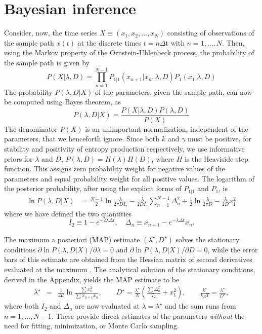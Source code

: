 \documentclass[fleqn,10pt]{wlscirep}
\begin{document}
\section*{Bayesian inference}
Consider, now, the time
series $X\equiv(x_{1},x_{2},\ldots,x_{N})$ consisting of observations
of the sample path $x(t)$ at the discrete times $t=n\Delta$t with
$n=1,\ldots,N.$ Then, using the Markov property of the Ornstein-Uhlenbeck
process, the probability of the sample path is given by \cite{wang1945theory}
\begin{equation}
P(X|\lambda,D)=\prod_{n=1}^{N-1}P_{1|1}(x_{n+1}|x_{n},\lambda,D)P_{1}(x_{1}|\lambda,D)
\end{equation}
The probability $P(\lambda,D|X)$ of the parameters, given the sample
path, can now be computed using Bayes theorem, as
\[
P(\lambda,D|X)=\frac{P(X|\lambda,D)P(\lambda,D)}{P(X)}
\]
The denominator $P(X)$ is an unimportant normalization, independent
of the parameters, that we henceforth ignore. Since both $k$ and
$\gamma$ must be positive, for stability and positivity of entropy
production respectively, we use informative priors for $\lambda$
and $D$, $P(\lambda,D)=H(\lambda)H(D)$, where $H$ is the Heaviside
step function. This assigns zero probability weight for negative values
of the parameters and equal probability weight for all positive values.
The logarithm of the posterior probability, after using the explicit
forms of $P_{1|1}$ and $P_{1}$, is
\begin{align}
\ln P(\lambda,D|X) & =\frac{N-1}{2}\ln\frac{\lambda}{2\pi DI_{2}}-\frac{\lambda}{2DI_{2}}\sum_{n=1}^{N-1}\Delta_{n}^{2}+\frac{1}{2}\ln\frac{\lambda}{2\pi D}-\frac{\lambda}{2D}x_{1}^{2}\label{eq:joint-posterior}
\end{align}
where we have defined the two quantities
\[
I_{2}\equiv1-e^{-2\lambda\Delta t},\quad\Delta_{n}\equiv x_{n+1}-e^{-\lambda\Delta t}x_{n}.
\]

The maximum a posteriori (MAP) estimate $(\lambda^{\star},D^{\star})$
solves the stationary conditions $\partial\ln P(\lambda,D|X)/\partial\lambda=0$
and $\partial\ln P(\lambda,D|X)/\partial D=0$, while the error bars
of this estimate are obtained from the Hessian matrix of second derivatives
evaluated at the maximum \cite{jeffreys1998theory,jaynes2003probability,sivia2006data}.
The analytical solution of the stationary conditions, derived in the
Appendix, yields the MAP estimate to be
\begin{eqnarray}
\lambda^{\star} & = & \frac{1}{\Delta t}\ln\frac{\sum x_{n}^{2}}{\sum x_{n+1}x_{n}},\qquad D^{\star}=\frac{\lambda^{\star}}{N}\left(\frac{\sum\Delta_{n}^{2}}{I_{2}}+x_{1}^{2}\right),\qquad\frac{k^{\star}}{k_{B}T}=\frac{\lambda^{\star}}{D^{\star}},\label{eq:map-estimate}
\end{eqnarray}
where both $I_{2}$ and $\Delta_{n}$ are now evaluated at $\lambda=\lambda^{\star}$
and the sum runs from $n=1,\ldots,N-1$. These provide direct estimates
of the parameters \emph{without} the need for fitting, minimization,
or Monte Carlo sampling. 
\end{document}

